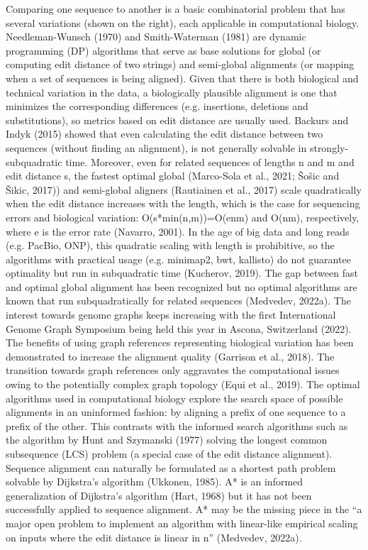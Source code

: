 Comparing one sequence to another is a basic combinatorial problem that has
several variations (shown on the right), each applicable in computational
biology. Needleman-Wunsch (1970)  and Smith-Waterman (1981) are dynamic
programming (DP) algorithms that serve as base solutions for global (or
computing edit distance of two strings) and semi-global alignments (or mapping
when a set of sequences is being aligned). Given that there is both biological
and technical variation in the data, a biologically plausible alignment is one
that minimizes the corresponding differences (e.g. insertions, deletions and
substitutions), so metrics based on edit distance are usually used. Backurs and
Indyk (2015) showed that even calculating the edit distance between two
sequences (without finding an alignment), is not generally solvable in
strongly-subquadratic time. Moreover, even for related sequences of lengths n
and m and edit distance s, the fastest optimal global (Marco-Sola et al., 2021;
Šošic and Šikic, 2017)) and semi-global aligners (Rautiainen et al., 2017) scale
quadratically when the edit distance increases with the length, which is the
case for sequencing errors and biological variation: O(s*min(n,m))=O(enm) and
O(nm), respectively, where e is the error rate (Navarro, 2001). In the age of
big data and long reads (e.g. PacBio, ONP), this quadratic scaling with length
is prohibitive, so the algorithms with practical usage (e.g. minimap2, bwt,
kallisto) do not guarantee optimality but run in subquadratic time (Kucherov,
2019). The gap between fast and optimal global alignment has been recognized but
no optimal algorithms are known that run subquadratically for related sequences
(Medvedev, 2022a). The interest towards genome graphs keeps increasing with the
first International Genome Graph Symposium being held this year in Ascona,
Switzerland (2022). The benefits of using graph references representing
biological variation has been demonstrated to increase the alignment quality
(Garrison et al., 2018). The transition towards graph references only aggravates
the computational issues owing to the potentially complex graph topology (Equi
et al., 2019). The optimal algorithms used in computational biology explore the
search space of possible alignments in an uninformed fashion: by aligning a
prefix of one sequence to a prefix of the other. This contrasts with the
informed search algorithms such as the algorithm by Hunt and Szymanski (1977)
solving the longest common subsequence (LCS) problem (a special case of the edit
distance alignment). Sequence alignment can naturally be formulated as a
shortest path problem solvable by Dijkstra’s algorithm (Ukkonen, 1985). A* is an
informed generalization of Dijkstra’s algorithm (Hart, 1968) but it has not been
successfully applied to sequence alignment. A* may be the missing piece in the
“a major open problem to implement an algorithm with linear-like empirical
scaling on inputs where the edit distance is linear in n” (Medvedev, 2022a).

